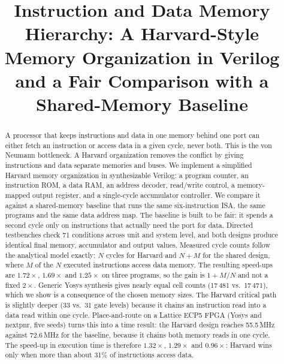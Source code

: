 \documentclass[conference]{IEEEtran}
\begin{document}
\title{Instruction and Data Memory Hierarchy: A Harvard-Style Memory Organization in Verilog and a Fair Comparison with a Shared-Memory Baseline}

\author{
}

\maketitle

\begin{abstract}
A processor that keeps instructions and data in one memory behind one port can either fetch an instruction or access data in a given cycle, never both. This is the von Neumann bottleneck. A Harvard organization removes the conflict by giving instructions and data separate memories and buses. We implement a simplified Harvard memory organization in synthesizable Verilog: a program counter, an instruction ROM, a data RAM, an address decoder, read/write control, a memory-mapped output register, and a single-cycle accumulator controller. We compare it against a shared-memory baseline that runs the same six-instruction ISA, the same programs and the same data address map. The baseline is built to be fair: it spends a second cycle only on instructions that actually need the port for data. Directed testbenches check 71 conditions across unit and system level, and both designs produce identical final memory, accumulator and output values. Measured cycle counts follow the analytical model exactly: $N$ cycles for Harvard and $N+M$ for the shared design, where $M$ of the $N$ executed instructions access data memory. The resulting speed-ups are $1.72\times$, $1.69\times$ and $1.25\times$ on three programs, so the gain is $1+M/N$ and not a fixed $2\times$. Generic Yosys synthesis gives nearly equal cell counts (17\,481 vs.\ 17\,471), which we show is a consequence of the chosen memory sizes. The Harvard critical path is slightly deeper (33 vs.\ 31 gate levels) because it chains an instruction read into a data read within one cycle. Place-and-route on a Lattice ECP5 FPGA (Yosys and nextpnr, five seeds) turns this into a time result: the Harvard design reaches 55.5\,MHz against 72.6\,MHz for the baseline, because it chains both memory reads in one cycle. The speed-up in execution time is therefore $1.32\times$, $1.29\times$ and $0.96\times$: Harvard wins only when more than about 31\% of instructions access data.
\end{abstract}
\end{document}
